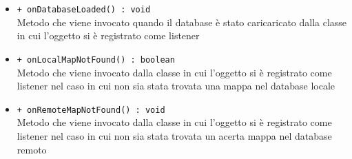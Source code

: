 \documentclass[../DefinizioneDiProdotto.tex]{subfiles}
\begin{document}
\begin{description}
\begin{itemize}
		\item \texttt{+ onDatabaseLoaded() : void}\\
		Metodo che viene invocato quando il database è stato caricaricato dalla classe in cui l'oggetto si è registrato come listener
		\item \texttt{+ onLocalMapNotFound() : boolean}\\
		Metodo che viene invocato dalla classe in cui l'oggetto si è registrato come listener nel caso in cui non sia stata trovata una mappa nel database locale
		\item \texttt{+ onRemoteMapNotFound() : void}\\
		Metodo che viene invocato dalla classe in cui l'oggetto si è registrato come listener nel caso in cui non sia stata trovata un acerta mappa nel database remoto
	\end{itemize}
\end{description}
\end{document}
